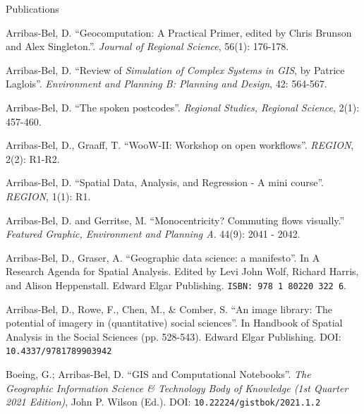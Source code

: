 \documentclass[12pt,2up]{article}
\begin{document}
\begin{cv}{}
\begin{cvlist}{Publications}
\item[] Arribas-Bel, D. ``Geocomputation: A Practical Primer, edited by Chris Brunson and Alex Singleton.''.
    \emph{Journal of Regional Science}, 56(1): 176-178.

\item[2015] Arribas-Bel, D. ``Review of \textit{Simulation of Complex Systems
    in GIS}, by Patrice Laglois''.
    \emph{Environment and Planning B: Planning and Design}, 42: 564-567.

\item[] Arribas-Bel, D. ``The spoken postcodes''.
    \emph{Regional Studies, Regional Science}, 2(1): 457-460.

\item[] Arribas-Bel, D., Graaff, T. ``WooW-II: Workshop on open workflows''.
    \emph{REGION}, 2(2): R1-R2.

\item[2014] Arribas-Bel, D. ``Spatial Data, Analysis, and Regression - A mini course''.
    \emph{REGION}, 1(1): R1.

\item[2012] Arribas-Bel, D. and Gerritse, M. ``Monocentricity? Commuting flows
    visually.'' \emph{Featured Graphic, Environment and Planning A}. 44(9):
    2041 - 2042.

\item[\textbf{Book chapters}]

\item[2024] Arribas-Bel, D., Graser, A.  ``Geographic data science: a manifesto''.
        In A Research Agenda for Spatial Analysis. 
        Edited by Levi John Wolf, Richard Harris, and Alison Heppenstall.
        Edward Elgar Publishing.
        \texttt{ISBN: 978 1 80220 322 6}.

\item[2023] Arribas-Bel, D., Rowe, F., Chen, M., \& Comber, S. ``An image library:
        The potential of imagery in (quantitative) social sciences''. In Handbook
        of Spatial Analysis in the Social Sciences (pp. 528-543).
        Edward Elgar Publishing. DOI: \texttt{10.4337/9781789903942}

\item[2020] Boeing, G.; Arribas-Bel, D. ``GIS and Computational
    Notebooks''. \emph{The Geographic Information Science \& Technology Body of
    Knowledge (1st Quarter 2021 Edition)}, John P. Wilson (Ed.). DOI:
    \texttt{10.22224/gistbok/2021.1.2}


\end{cvlist}
\end{cv}
\end{document}

